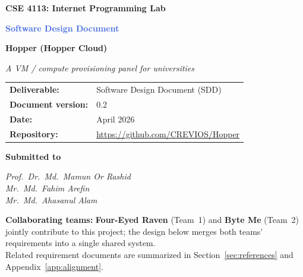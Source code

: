 \documentclass[12pt,a4paper]{article}
\newcommand{\ByteMeHeading}{Byte Me}
\newcommand{\ByteMe}{%
  \texorpdfstring{\textbf{\ByteMeHeading}}{Byte Me}%
}
\begin{document}
\begin{titlepage}
  \centering
  \vspace*{1cm}
  {\Large\textbf{CSE 4113: Internet Programming Lab}\par}
  \vspace{0.75cm}
  {\huge\textbf{\textcolor{RoyalBlue}{Software Design Document}}\par}
  \vspace{0.35cm}
  {\LARGE\textbf{Hopper (Hopper Cloud)}\par}
  \vspace{0.25cm}
  {\large\itshape A VM / compute provisioning panel for universities\par}
  \vspace{1.5cm}

  \begin{tabular}{@{}ll@{}}
    \textbf{Deliverable:} & Software Design Document (SDD) \\
    \textbf{Document version:} & 0.2 \\
    \textbf{Date:} & April 2026 \\
    \textbf{Repository:} & \url{https://github.com/CREVIOS/Hopper} \\
  \end{tabular}

  \vspace{1.25cm}
  {\large\textbf{Submitted to}\par}
  \vspace{0.4cm}
  \textit{Prof.\ Dr.\ Md.\ Mamun Or Rashid}\\
  \textit{Mr.\ Md.\ Fahim Arefin}\\
  \textit{Mr.\ Md.\ Ahasanul Alam}

  \vfill
  \begin{minipage}{0.92\textwidth}
    \small
    \textbf{Collaborating teams:} \textbf{Four-Eyed Raven} (Team~1) and \ByteMe{} (Team~2) jointly contribute to this project; the design below merges both teams' requirements into a single shared system.\\
    Related requirement documents are summarized in Section~\ref{sec:references} and Appendix~\ref{app:alignment}.
  \end{minipage}
  \vspace{0.75cm}
\end{titlepage}

\setcounter{page}{1}

\begin{abstract}
\noindent
This Software Design Document specifies the \textbf{architecture and major design decisions} for \textbf{Hopper}, a self-hosted platform that gives students and staff \textbf{self-service access} to isolated workloads on \textbf{Kubernetes}, with \textbf{institutional SSO (Keycloak)}, \textbf{credit-based usage}, and a \textbf{web portal (SvelteKit)} backed by a \textbf{FastAPI} gateway and a \textbf{Go} orchestration service. The design reflects a \textbf{collaboration} between \textbf{Four-Eyed Raven} and \ByteMe{}, bringing together both teams' Software Requirements Specifications into one consolidated implementation.
\end{abstract}
\end{document}
